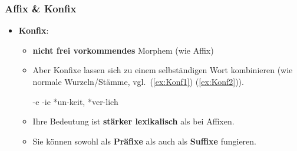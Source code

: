\begin{frame}
\frametitle{Affix \& Konfix}

\begin{itemize}
\item \textbf{Konfix}: 

\begin{itemize}
	\item \textbf{nicht frei vorkommendes} Morphem (wie Affix)
	\item Aber Konfixe lassen sich zu einem selbständigen Wort kombinieren (wie normale Wurzeln/Stämme, vgl.\ (\ref{ex:Konf1}) \vs (\ref{ex:Konf2})).
	
	\ea
		\ea\label{ex:Konf1} -e
		\ex {}-ie
		\ex\label{ex:Konf2} *un-keit, *ver-lich
		\z 
	\z 
	
	\item Ihre Bedeutung ist \textbf{stärker lexikalisch} als bei Affixen.
	
	\item Sie können sowohl als \textbf{Präfixe} als auch als \textbf{Suffixe} fungieren.
	
		\ea 
			\z 
		\z 
	\end{itemize}
\end{itemize}

\end{frame}


